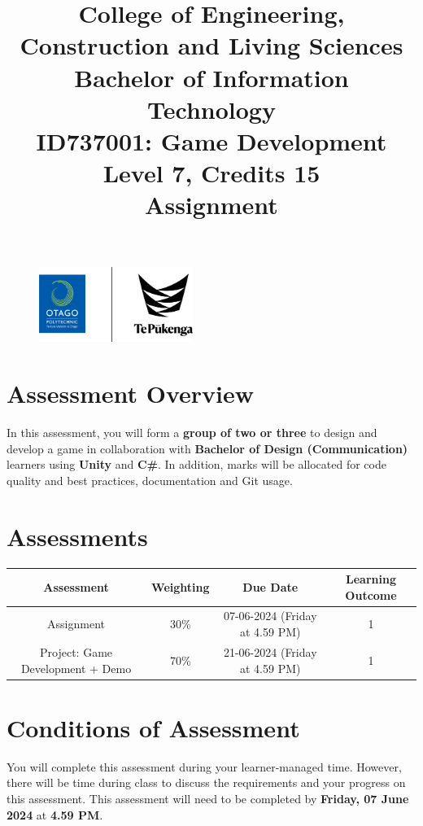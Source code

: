 \documentclass{article}
\author{}
\begin{document}
\begin{figure}
	\centering
	\includegraphics[width=50mm]{../../resources/img/logo.png}
\end{figure}

\title{College of Engineering, Construction and Living Sciences\\Bachelor of Information Technology\\ID737001: Game Development\\Level 7, Credits 15\\\textbf{Assignment}}
\date{}
\maketitle

\section*{Assessment Overview}
In this assessment, you will form a \textbf{group of two or three} to design and develop a game in collaboration with \textbf{Bachelor of Design (Communication)} learners using \textbf{Unity} and \textbf{C\#}. In addition, marks will be allocated for code quality and best practices, documentation and Git usage.

\section*{Assessments}
\renewcommand{\arraystretch}{1.5}
\begin{tabular}{|c|c|c|c|}
	\hline
	\textbf{Assessment}                                 & \textbf{Weighting} & \textbf{Due Date}            & \textbf{Learning Outcome} \\ \hline
	\small Assignment  & \small 30\%        & \small 07-06-2024 (Friday at 4.59 PM)   & \small 1                  \\ \hline
	\small Project: Game Development + Demo & \small 70\%        & \small 21-06-2024 (Friday at 4.59 PM)   & \small 1                   \\ \hline
\end{tabular} 

\section*{Conditions of Assessment}
You will complete this assessment during your learner-managed time. However, there will be time during class to discuss the requirements and your progress on this assessment. This assessment will need to be completed by \textbf{Friday, 07 June 2024} at \textbf{4.59 PM}. 
\end{document}
